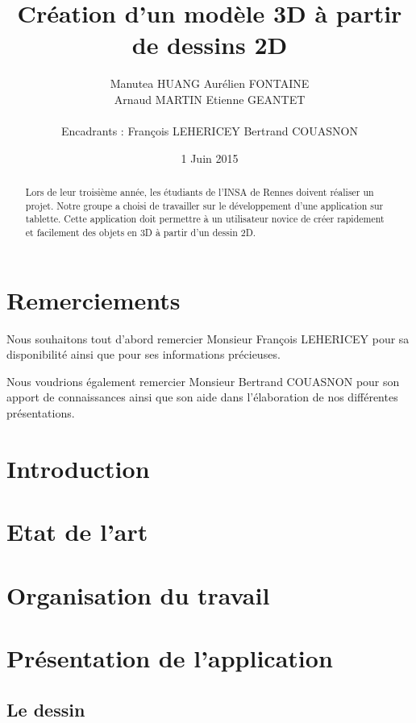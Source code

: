 \documentclass[a4paper,11pt]{article}
\title{ \textbf{Création d'un modèle 3D à partir de dessins 2D} }
\author{ Manutea \textsc{HUANG} Aurélien \textsc{FONTAINE} \\
	Arnaud \textsc{MARTIN} Etienne \textsc{GEANTET} \\
	\\
	Encadrants : François \textsc{LEHERICEY}	Bertrand \textsc{COUASNON}}
\date{1 Juin 2015}                    %
\begin{document}
\maketitle                 %
\thispagestyle{empty}      %

\begin{abstract}
	Lors de leur troisième année, les étudiants de l'INSA de Rennes doivent réaliser un projet. Notre groupe a choisi de travailler sur le développement d'une application sur tablette. Cette application doit permettre à un utilisateur novice de créer rapidement et facilement des objets en 3D à partir d'un dessin 2D. 
\end{abstract}
	
	\section{Remerciements}
		Nous souhaitons tout d'abord remercier Monsieur François LEHERICEY pour sa disponibilité ainsi que pour ses informations précieuses.
		
		Nous voudrions également remercier Monsieur Bertrand COUASNON pour son apport de connaissances ainsi que son aide dans l'élaboration de nos différentes présentations.
				
	\section{Introduction}
	\section{Etat de l'art}
	\section{Organisation du travail}
	\section{Présentation de l'application}
		\subsection{Le dessin}
\end{document}
